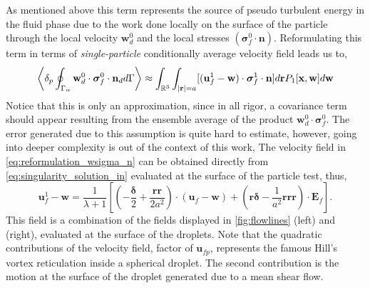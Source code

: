 As mentioned above this term represents the source of pseudo turbulent energy in the fluid phase due to the work done locally on the surface of the particle through the local velocity $\textbf{w}_d^0$ and the local stresses $(\bm\sigma_f^0 \cdot \textbf{n})$.
Reformulating this term in terms of \textit{single-particle} conditionally average velocity field leads us to, 
\begin{equation}
    \pavg{ \intS{\textbf{w}_d^0 \cdot \bm{\sigma}_f^0 \cdot \textbf{n}_d}}
    \approx
    \int_{\mathbb{R}^3} \int_{|\textbf{r}| = a}
    [(\textbf{u}^1_f - \textbf{w})\cdot \bm\sigma_f^1\cdot \textbf{n} ]
    d\textbf{r}
    P_1[\textbf{x},\textbf{w}]
    d\textbf{w} 
    \label{eq:reformulation_wsigma_n}
\end{equation} 
Notice that this is only an approximation, since in all rigor, a covariance term should appear resulting from the ensemble average of the product $\textbf{w}_d^0 \cdot \bm{\sigma}_f^0$. 
The error generated due to this assumption is quite hard to estimate, however, going into deeper complexity is out of the context of this work, 
The velocity field in \ref{eq:reformulation_wsigma_n} can be obtained directly from \ref{eq:singularity_solution_in}  evaluated at the surface of the particle test, thus,
\begin{equation*}
    \textbf{u}^1_f - \textbf{w}
    = 
    \frac{1}{\lambda +1} \left[\left(
        -\frac{\bm\delta}{2}
        + 
        \frac{\textbf{rr}}{2a^2}
    \right)\cdot (\textbf{u}_{f} - \textbf{w}) 
    + \left(\textbf{r}\bm\delta
    -\frac{1}{a^2}\textbf{rrr}\right)\cdot \textbf{E}_f
    \right].
\end{equation*}
This field is a combination of the fields displayed in \ref{fig:flowlines} (left) and (right), evaluated at the surface of the droplets. 
Note that the quadratic contributions of the velocity field, factor of $\textbf{u}_{fp}$, represents the famous Hill's vortex reticulation inside a spherical droplet. 
The second contribution is the motion at the surface of the droplet generated due to a mean shear flow. 

